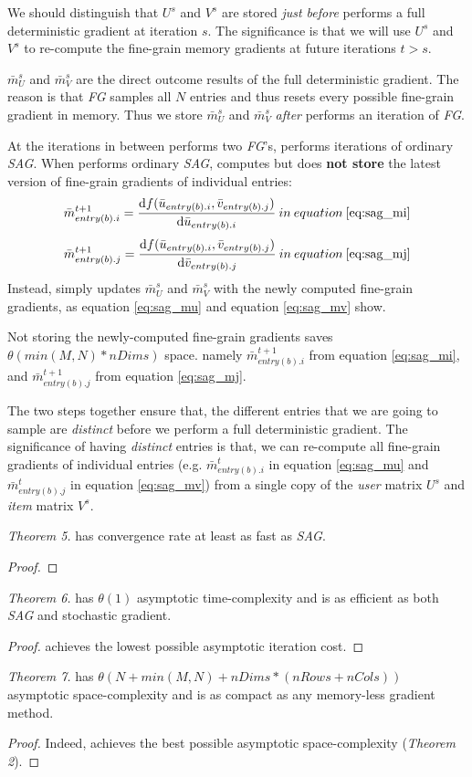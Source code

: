 We should distinguish that $U^{s}$ and $V^{s}$ are stored \emph{just before} \tool performs a full deterministic gradient at iteration $s$.
The significance is that we will use $U^{s}$ and $V^{s}$ to re-compute the fine-grain memory gradients at future iterations $t > s$.

$\bar{m}_{U}^{s}$ and $\bar{m}_{V}^{s}$ are the direct outcome results of the full deterministic gradient.  
The reason is that \emph{FG} samples all $N$ entries and thus resets every possible fine-grain gradient in memory.
Thus we store $\bar{m}_{U}^{s}$ and $\bar{m}_{V}^{s}$ \emph{after} \tool performs an iteration of \emph{FG}.

At the iterations in between \tool performs two \emph{FG}'s, \tool performs iterations of ordinary \emph{SAG}.
When \tool performs ordinary \emph{SAG}, \tool computes but does \textbf{not store} the latest version of fine-grain gradients of individual entries: 
\[
\bar{m}_{entry(b).i}^{t+1} = \frac{\text{d}f(\bar{u}_{entry(b).i}, \bar{v}_{entry(b).j})}{\text{d}\bar{u}_{entry(b).i}}\:in\:equation\:\ref{eq:sag_mi}
\]
\[
\bar{m}_{entry(b).j}^{t+1} = \frac{\text{d}f(\bar{u}_{entry(b).i}, \bar{v}_{entry(b).j})}{\text{d}\bar{v}_{entry(b).j}}\:in\:equation\:\ref{eq:sag_mj}
\]
Instead, \tool simply updates $\bar{m}_{U}^{s}$ and $\bar{m}_{V}^{s}$ with the newly computed fine-grain gradients, as equation \ref{eq:sag_mu} and equation \ref{eq:sag_mv} show.

Not storing the newly-computed fine-grain gradients saves $\theta(min(M,N)*nDims)$ space. 
namely $\bar{m}_{entry(b).i}^{t+1}$ from equation \ref{eq:sag_mi}, and $\bar{m}_{entry(b).j}^{t+1}$ from equation \ref{eq:sag_mj}.

The two steps together ensure that, the different entries that we are going to sample are \emph{distinct} before we perform a full deterministic gradient.
The significance of having \emph{distinct} entries is that, 
we can re-compute all fine-grain gradients of individual entries (e.g. $\bar{m}_{entry(b).i}^{t}$ in equation \ref{eq:sag_mu} and $\bar{m}_{entry(b).j}^{t}$ in equation \ref{eq:sag_mv}) 
from a single copy of the \emph{user} matrix $U^{s}$ and \emph{item} matrix $V^{s}$.


\emph{Theorem 5.}
\tool has convergence rate at least as fast as \emph{SAG}.
\begin{proof}

\end{proof}


\emph{Theorem 6.}
\tool has $\theta(1)$ asymptotic time-complexity and is as efficient as both \emph{SAG} and stochastic gradient.
\begin{proof}
\tool achieves the lowest possible asymptotic iteration cost.
\end{proof}


\emph{Theorem 7.}
\tool has $\theta(N + min(M,N) + nDims*(nRows+nCols))$ asymptotic space-complexity and is as compact as any memory-less gradient method.
\begin{proof}
Indeed, \tool achieves the best possible asymptotic space-complexity (\emph{Theorem 2}).
\end{proof}
